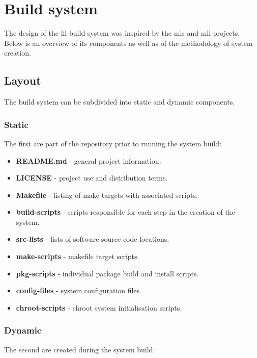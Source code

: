 \section{Build system}\label{Build system}

The design of the \gls{lfl} build system was inspired by the \gls{mls} \cite{mls} and \gls{mll} \cite{mll} projects. Below is an overview of its components as well as of the methodology of system creation.

\subsection{Layout}

The build system can be subdivided into static and dynamic components.

\subsubsection{Static}

The first are part of the repository prior to running the system build:

\begin{itemize}
    \item \textbf{README.md} - general project information.
    \item \textbf{LICENSE} - project use and distribution terms.
    \item \textbf{Makefile} - listing of make targets with associated scripts.
    \item \textbf{build-scripts} - scripts responsible for each step in the creation of the system.
    \item \textbf{src-lists} - lists of software source code locations.
    \item \textbf{make-scripts} - makefile target scripts.
    \item \textbf{pkg-scripts} - individual package build and install scripts.
    \item \textbf{config-files} - system configuration files.
    \item \textbf{chroot-scripts} - chroot system initialisation scripts.
\end{itemize}

\subsubsection{Dynamic}

The second are created during the system build:

